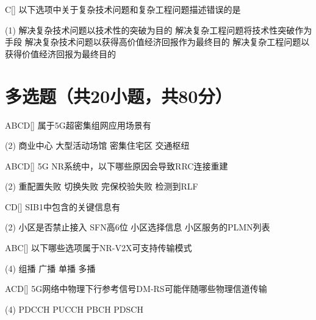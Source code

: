 \begin{choice}{C}[]
	以下选项中关于复杂技术问题和复杂工程问题描述错误的是
	\begin{tasks}(1)
		\task 解决复杂技术问题以技术性的突破为目的
		\task 解决复杂工程问题将技术性突破作为手段
		\task 解决复杂技术问题以获得高价值经济回报作为最终目的
		\task 解决复杂工程问题以获得价值经济回报为最终目的
	\end{tasks}
\end{choice}

\section{多选题（共20小题，共80分）}

\begin{choice}{\;ABCD\;}[]
	属于5G超密集组网应用场景有
	\begin{tasks}(2)
		\task 商业中心
		\task 大型活动场馆
		\task 密集住宅区
		\task 交通枢纽
	\end{tasks}
\end{choice}

\begin{choice}{\;ABCD\;}[]
	5G NR系统中，以下哪些原因会导致RRC连接重建
	\begin{tasks}(2)
		\task 重配置失败
		\task 切换失败
		\task 完保校验失败
		\task 检测到RLF
	\end{tasks}
\end{choice}

\begin{choice}{\;CD\;}[]
	SIB1中包含的关键信息有
	\begin{tasks}(2)
		\task 小区是否禁止接入
		\task SFN高6位
		\task 小区选择信息
		\task 小区服务的PLMN列表
	\end{tasks}
\end{choice}
\begin{choice}{\;ABC\;}[]
	以下哪些选项属于NR-V2X可支持传输模式
	\begin{tasks}(4)
		\task 组播
		\task 广播
		\task 单播
		\task 多播
	\end{tasks}
\end{choice}


\begin{choice}{\;ACD\;}[]
	5G网络中物理下行参考信号DM-RS可能伴随哪些物理信道传输
	\begin{tasks}(4)
		\task PDCCH
		\task PUCCH
		\task PBCH
		\task PDSCH
	\end{tasks}
\end{choice}

